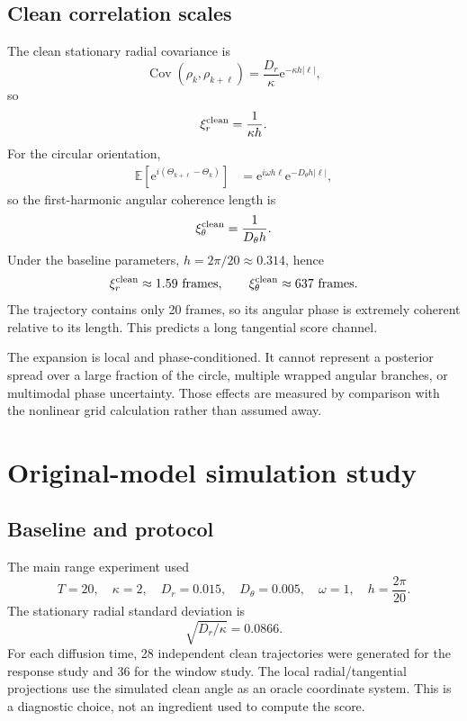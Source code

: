 \documentclass[11pt,a4paper]{article}
\newcommand{\E}{\mathbb{E}}
\newcommand{\Cov}{\operatorname{Cov}}
\newcommand{\e}{\mathrm e}
\begin{document}
\subsection{Clean correlation scales}

The clean stationary radial covariance is
\begin{equation}
 \Cov(\rho_k,\rho_{k+\ell})
 =\frac{D_r}{\kappa}\e^{-\kappa h|\ell|},
\end{equation}
so
\begin{equation}
 \xi_r^{\rm clean}=\frac{1}{\kappa h}.
\end{equation}
For the circular orientation,
\begin{align}
 \E\left[\e^{i(\Theta_{k+\ell}-\Theta_k)}\right]
 &=\e^{i\omega h\ell}\e^{-D_\theta h|\ell|},
\end{align}
so the first-harmonic angular coherence length is
\begin{equation}
 \xi_\theta^{\rm clean}=\frac{1}{D_\theta h}.
\end{equation}
Under the baseline parameters, $h=2\pi/20\approx0.314$, hence
\[
 \xi_r^{\rm clean}\approx1.59\ \text{frames},
 \qquad
 \xi_\theta^{\rm clean}\approx637\ \text{frames}.
\]
The trajectory contains only 20 frames, so its angular phase is extremely coherent relative to its length. This predicts a long tangential score channel.

\begin{caution}
The expansion is local and phase-conditioned. It cannot represent a posterior spread over a large fraction of the circle, multiple wrapped angular branches, or multimodal phase uncertainty. Those effects are measured by comparison with the nonlinear grid calculation rather than assumed away.
\end{caution}

\section{Original-model simulation study}

\subsection{Baseline and protocol}

The main range experiment used
\begin{equation}
 T=20,
 \quad \kappa=2,
 \quad D_r=0.015,
 \quad D_\theta=0.005,
 \quad \omega=1,
 \quad h=\frac{2\pi}{20}.
 \label{eq:baseline}
\end{equation}
The stationary radial standard deviation is
\[
 \sqrt{D_r/\kappa}=0.0866.
\]
For each diffusion time, 28 independent clean trajectories were generated for the response study and 36 for the window study. The local radial/tangential projections use the simulated clean angle as an oracle coordinate system. This is a diagnostic choice, not an ingredient used to compute the score.
\end{document}
